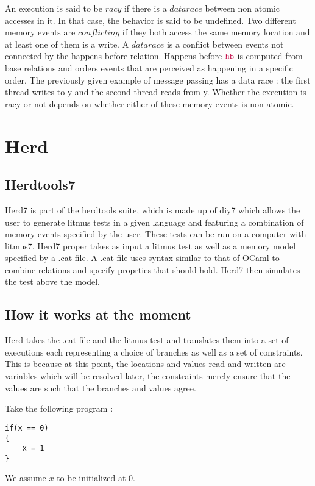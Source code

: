 \documentclass[a4,11pt,dvipsnames]{article}
\begin{document}
An execution is said to be $racy$ if there is a $data race$ between non atomic accesses in it. In that case, the behavior is said to be undefined. Two different memory events are $conflicting$ if they both access the same memory location and at least one of them is a write. A $data race$ is a conflict between events not connected by the happens before relation. Happens before $\texttt{\color{purple}hb}$ is computed from base relations and orders events that are perceived as happening in a specific order.
The previously given example of message passing has a data race : the first thread writes to y and the second thread reads from y. Whether the execution is racy or not depends on whether either of these memory events is non atomic.

\section{Herd}

\subsection{Herdtools7}

Herd7 is part of the herdtools suite, which is made up of diy7 which allows the user to generate litmus tests in a given language and featuring a combination of memory events specified by the user. These tests can be run on a computer with litmus7. Herd7 proper takes as input a litmus test as well as a memory model specified by a .cat file. A .cat file uses syntax similar to that of OCaml to combine relations and specify proprties that should hold. Herd7 then simulates the test above the model.

\subsection{How it works at the moment}

Herd takes the .cat file and the litmus test and translates them into a set of executions each representing a choice of branches as well as a set of constraints. This is because at this point, the locations and values read and written are variables which will be resolved later, the constraints merely ensure that the values are such that the branches and values agree.

Take the following program :

\begin{lstlisting}
if(x == 0)
{
	x = 1
}
\end{lstlisting}
{\footnotesize{We assume $x$ to be initialized at 0.}}
\end{document}
